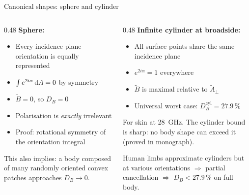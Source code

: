\begin{frame}[label=app-p2-canonical]{Canonical shapes: sphere and cylinder}

  \begin{columns}[T]
    \begin{column}{0.48\textwidth}
      \textbf{Sphere:}
      \begin{itemize}
        \item Every incidence plane orientation is equally represented
        \item $\int e^{2i\alpha}\,\mathrm{d} A = 0$ by symmetry
        \item $\tilde{B} = 0$, so $D_B = 0$
        \item Polarisation is \emph{exactly} irrelevant
        \item Proof: rotational symmetry of the orientation integral
      \end{itemize}

      \vspace{4pt}
      {\footnotesize This also implies: a body composed of many randomly oriented convex patches approaches $D_B \to 0$.}
    \end{column}

    \begin{column}{0.48\textwidth}
      \textbf{Infinite cylinder at broadside:}
      \begin{itemize}
        \item All surface points share the same incidence plane
        \item $e^{2i\alpha} = 1$ everywhere
        \item $\tilde{B}$ is maximal relative to $\tilde{A}_\perp$
        \item Universal worst case: $D_B^{\mathrm{cyl}} = 27.9\,\%$
      \end{itemize}

      \vspace{4pt}
      {\footnotesize For skin at \SI{28}{\giga\hertz}. The cylinder bound is sharp: no body shape can exceed it (proved in monograph).}

      \vspace{4pt}
      Human limbs approximate cylinders but at various orientations $\Rightarrow$ partial cancellation $\Rightarrow$ $D_B < 27.9\,\%$ on full body.
    \end{column}
  \end{columns}

  \vspace{4pt}
  \quad{}
\end{frame}

